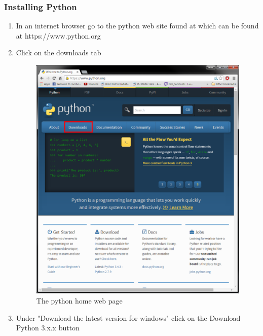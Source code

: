 \subsubsection{Installing Python}
\begin{enumerate}
\item In an internet browser go to the python web site found at which can be found at https://www.python.org
\item Click on the downloads tab
\begin{figure}[H]
\includegraphics[width=\textwidth]{./Manual/PythonInstall/Part1.png}
\caption{The python home web page} \label{fig:PyISP1}
\end{figure}
\item Under "Download the latest version for windows" click on the Download Python 3.x.x button
\begin{figure}[H]

\end{figure}
\end{enumerate}
